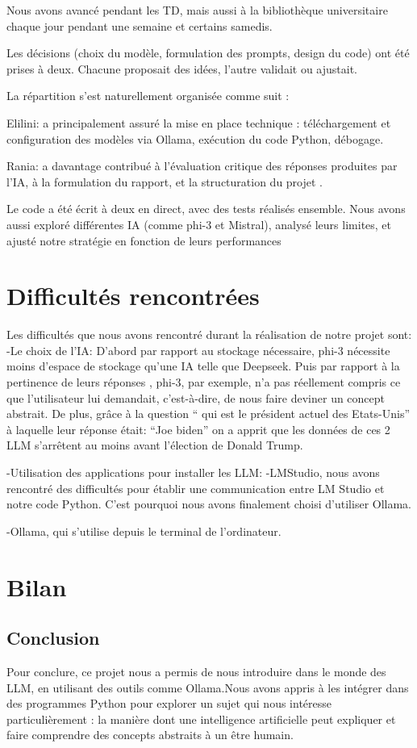 \documentclass[a4paper, 12pt, twoside]{article}
\begin{document}
Nous avons avancé pendant les TD, mais aussi à la bibliothèque universitaire chaque jour pendant une semaine et certains samedis.

Les décisions (choix du modèle, formulation des prompts, design du code) ont été prises à deux. Chacune proposait des idées, l'autre validait ou ajustait.

La répartition s’est naturellement organisée comme suit :

Elilini: a principalement assuré la mise en place technique : téléchargement et configuration des modèles via Ollama, exécution du code Python, débogage.

Rania: a davantage contribué à l’évaluation critique des réponses produites par l’IA, à la formulation  du rapport, et la structuration du projet .

Le code a été écrit à deux en direct, avec des tests réalisés ensemble. Nous avons aussi exploré différentes IA (comme phi-3 et Mistral), analysé leurs limites, et ajusté notre stratégie en fonction de leurs performances

\newpage
\section{Difficultés rencontrées}
Les difficultés que nous avons rencontré durant la réalisation de notre projet sont: 
-Le choix de l’IA: 
D’abord par rapport au stockage nécessaire,  phi-3 nécessite moins  d’espace de stockage qu'une IA telle que Deepseek. 
Puis par rapport à la pertinence de leurs réponses , phi-3, par exemple, n’a pas réellement compris ce que l’utilisateur lui demandait, c’est-à-dire, de nous faire deviner un concept abstrait. 
De plus, grâce à la question “ qui est le président actuel des Etats-Unis” à laquelle leur réponse était: “Joe biden”  on a apprit que les données de ces 2 LLM s'arrêtent au moins avant l’élection de Donald Trump.
  
-Utilisation des applications pour installer les LLM:
-LMStudio,  nous avons rencontré des difficultés pour établir une communication entre LM Studio et notre code Python. C’est pourquoi nous avons finalement choisi d’utiliser Ollama. 

-Ollama, qui s’utilise depuis le terminal de l’ordinateur. 

\section{Bilan}
	\subsection{Conclusion}
     Pour conclure, ce projet nous a permis  de nous introduire dans le monde des LLM, en utilisant des outils comme Ollama.Nous avons appris à les intégrer dans des programmes Python pour explorer un sujet qui nous intéresse particulièrement : la manière dont une intelligence artificielle peut expliquer et faire comprendre des concepts abstraits à un être humain.
     
\end{document}
